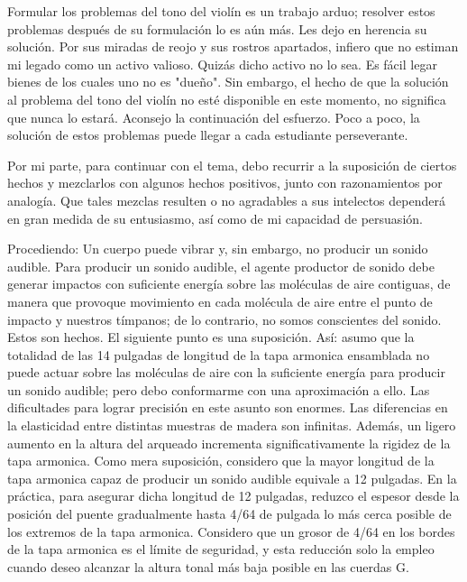 \documentclass[12pt]{book}
\begin{document}
Formular los problemas del tono del violín es un trabajo arduo; resolver estos problemas después de su formulación lo es aún más. Les dejo en herencia su solución. Por sus miradas de reojo y sus rostros apartados, infiero que no estiman mi legado como un activo valioso. Quizás dicho activo no lo sea. Es fácil legar bienes de los cuales uno no es "dueño". Sin embargo, el hecho de que la solución al problema del tono del violín no esté disponible en este momento, no significa que nunca lo estará. Aconsejo la continuación del esfuerzo. Poco a poco, la solución de estos problemas puede llegar a cada estudiante perseverante.

Por mi parte, para continuar con el tema, debo recurrir a la suposición de ciertos hechos y mezclarlos con algunos hechos positivos, junto con razonamientos por analogía. Que tales mezclas resulten o no agradables a sus intelectos dependerá en gran medida de su entusiasmo, así como de mi capacidad de persuasión.

Procediendo: Un cuerpo puede vibrar y, sin embargo, no producir un sonido audible. Para producir un sonido audible, el agente productor de sonido debe generar impactos con suficiente energía sobre las moléculas de aire contiguas, de manera que provoque movimiento en cada molécula de aire entre el punto de impacto y nuestros tímpanos; de lo contrario, no somos conscientes del sonido. Estos son hechos. El siguiente punto es una suposición. Así: asumo que la totalidad de las 14 pulgadas de longitud de la tapa armonica ensamblada no puede actuar sobre las moléculas de aire con la suficiente energía para producir un sonido audible; pero debo conformarme con una aproximación a ello. Las dificultades para lograr precisión en este asunto son enormes. Las diferencias en la elasticidad entre distintas muestras de madera son infinitas. Además, un ligero aumento en la altura del arqueado incrementa significativamente la rigidez de la tapa armonica. Como mera suposición, considero que la mayor longitud de la tapa armonica capaz de producir un sonido audible equivale a 12 pulgadas. En la práctica, para asegurar dicha longitud de 12 pulgadas, reduzco el espesor desde la posición del puente gradualmente hasta 4/64 de pulgada lo más cerca posible de los extremos de la tapa armonica. Considero que un grosor de 4/64 en los bordes de la tapa armonica es el límite de seguridad, y esta reducción solo la empleo cuando deseo alcanzar la altura tonal más baja posible en las cuerdas G.
\end{document}
